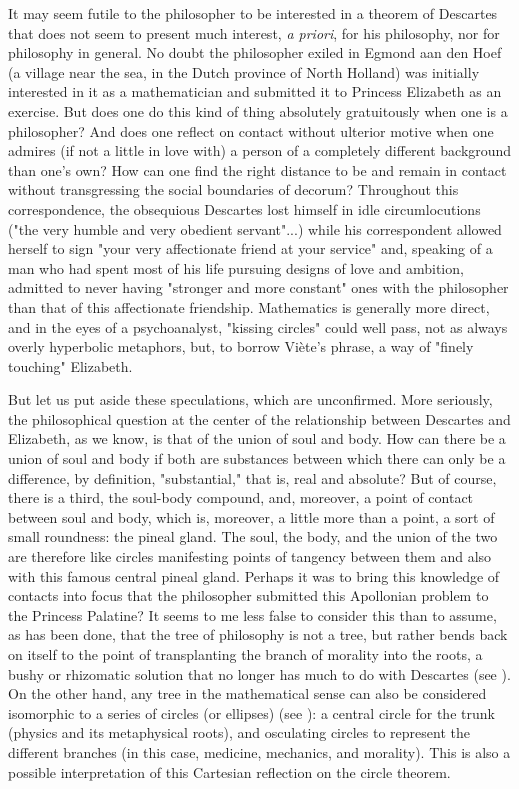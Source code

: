 \documentclass[12pt]{article}
\theoremstyle{définition}
\theoremstyle{remark}
\theoremstyle{plain}
\theoremstyle{plain}
\begin{document}
It may seem futile to the philosopher to be interested in a theorem of Descartes that does not seem to present much interest, {\it a priori}, for his philosophy, nor for philosophy in general. No doubt the philosopher exiled in Egmond aan den Hoef  (a village near the sea, in the Dutch province of North Holland) was initially interested in it as a mathematician and submitted it to Princess Elizabeth as an exercise. But does one do this kind of thing absolutely gratuitously when one is a philosopher? And does one reflect on contact without ulterior motive when one admires (if not a little in love with) a person of a completely different background than one's own? How can one find the right distance to be and remain in contact without transgressing the social boundaries of decorum? Throughout this correspondence, the obsequious Descartes lost himself in idle circumlocutions ("the very humble and very obedient servant"...) while his correspondent allowed herself to sign "your very affectionate friend at your service" and, speaking of a man who had spent most of his life pursuing designs of love and ambition, admitted to never having "stronger and more constant" ones with the philosopher than that of this affectionate friendship. Mathematics is generally more direct, and in the eyes of a psychoanalyst, "kissing circles" could well pass, not as always overly hyperbolic metaphors, but, to borrow Viète's phrase, a way of "finely touching" Elizabeth. 

But let us put aside these speculations, which are unconfirmed. More seriously, the philosophical question at the center of the relationship between Descartes and Elizabeth, as we know, is that of the union of soul and body. How can there be a union of soul and body if both are substances between which there can only be a difference, by definition, "substantial," that is, real and absolute? But of course, there is a third, the soul-body compound, and, moreover, a point of contact between soul and body, which is, moreover, a little more than a point, a sort of small roundness: the pineal gland. The soul, the body, and the union of the two are therefore like circles manifesting points of tangency between them and also with this famous central pineal gland. Perhaps it was to bring this knowledge of contacts into focus that the philosopher submitted this Apollonian problem to the Princess Palatine? It seems to me less false to consider this than to assume, as has been done, that the tree of philosophy is not a tree, but rather bends back on itself to the point of transplanting the branch of morality into the roots, a bushy or rhizomatic solution that no longer has much to do with Descartes (see \cite{Vaq}). On the other hand, any tree in the mathematical sense can also be considered isomorphic to a series of circles (or ellipses) (see \cite{Par2}): a central circle for the trunk (physics and its metaphysical roots), and osculating circles to represent the different branches (in this case, medicine, mechanics, and morality). This is also a possible interpretation of this Cartesian reflection on the circle theorem.
\end{document}
